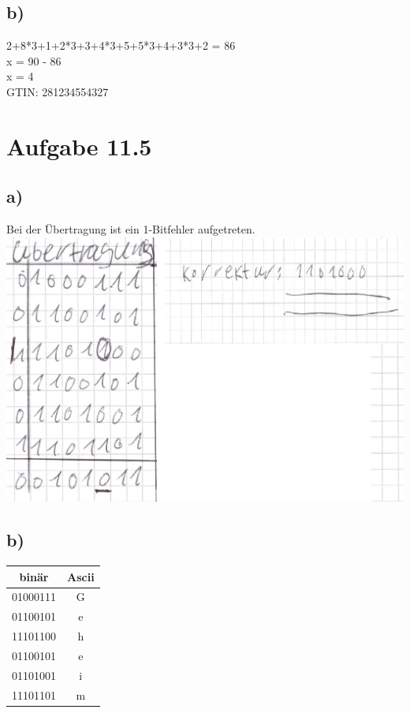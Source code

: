 \documentclass{article}
\begin{document}
	\subsection*{b)}
	2+8*3+1+2*3+3+4*3+5+5*3+4+3*3+2 = 86 \\
	x = 90 - 86 \\
	x = 4 \\
	GTIN: 281234554327
	\section*{Aufgabe 11.5}
	\subsection*{a)}
	Bei der Übertragung ist ein 1-Bitfehler aufgetreten. \\
	\includegraphics[width=\linewidth]{115a}
	\subsection*{b)}
	\begin{tabular}[h]{c|c}
		binär &  Ascii \\
		\hline
		01000111 & G \\
		01100101 & e\\
		11101100& h \\
		01100101 & e \\
		01101001 & i\\
		11101101 & m
	\end{tabular}
\end{document}
